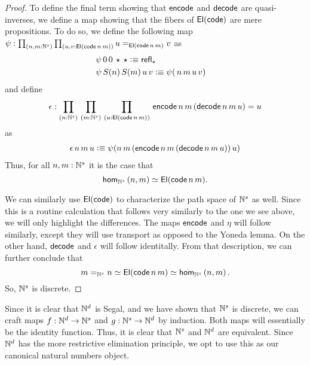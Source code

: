 \documentclass[main.tex]{subfiles}
\begin{document}
\begin{proof}
    To define the final term showing that $\eco$ and $\dco$ are quasi-inverses, we define a map showing that the fibers of $\El(\co)$ are mere propositions. To do so, we define the following map
     $\psi : \prd{n , m: \Ns}{u,v : \El(\co\,n\,m)}u=_{\El(\co\,n\,m)} v$ as
    \begin{align*}
        &\psi\,0\,0\,\star\,\star\defeq \refl{\star}\\
        &\psi\,S(n)\,S(m)\,u\,v\defeq\psi(\,n\,m\,u\,v)&
    \end{align*}
    and define 
$$\epsilon : \prd{n:\Ns}{m:\Ns}{u : \El(\co \, n\, m)}\eco\,n\,m\,(\dco\,n\,m \,u) =u$$
as
\begin{align*}
    \epsilon\,n\,m\,u \defeq \psi(n\,m\,(\eco\,n\,m\,(\dco\,n\,m \,u))\,u)
\end{align*}
    Thus, for all $n,m : \Ns$ it is the case that
    $$\ho[\Ns]{n}{m}\simeq \El(\co\,n\,m).$$

    We can similarly use $\El(\co)$ to characterize the path space of $\Ns$ as well. Since this is a routine calculation that follows very similarly to the one we see above, we will only highlight the differences. The maps $\eco$ and $\eta$ will follow similarly, except they will use transport as opposed to the Yoneda lemma. On the other hand, $\dco$ and $\epsilon$ will follow identitally. From that description, we can further conclude that 
    $$m=_{\Ns} n \simeq \El(\co\,n\,m) \simeq \ho[\Ns]{n}{m}.$$
    So, $\Ns$ is discrete.
\end{proof}

Since it is clear that $\Nd$ is Segal, and we have shown that $\Ns$ is discrete, we can craft maps
$f : \Nd \to \Ns$ and $g : \Ns \to \Nd$ by induction. Both maps will essentially be the identity function. Thus, it is clear that $\Ns$ and $\Nd$ are equivalent. Since $\Nd$ has the more restrictive elimination principle,
we opt to use this as our canonical natural numbers object. 
\end{document}
